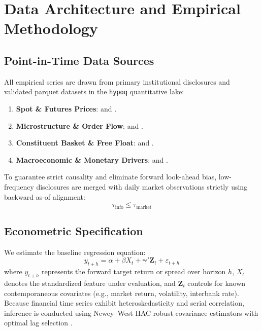\documentclass{article}
\begin{document}
\section{Data Architecture and Empirical Methodology}
\label{sec:data_methods}

\subsection{Point-in-Time Data Sources}
All empirical series are drawn from primary institutional disclosures and validated parquet datasets in the \texttt{hypoq} quantitative lake:
\begin{enumerate}
    \item \textbf{Spot \& Futures Prices}:  and .
    \item \textbf{Microstructure \& Order Flow}:  and .
    \item \textbf{Constituent Basket \& Free Float}:  and .
    \item \textbf{Macroeconomic \& Monetary Drivers}:  and .
\end{enumerate}

To guarantee strict causality and eliminate forward look-ahead bias, low-frequency disclosures are merged with daily market observations strictly using backward as-of alignment:
\begin{equation}
    \tau_{\text{info}} \le \tau_{\text{market}}
\end{equation}

\subsection{Econometric Specification}
We estimate the baseline regression equation:
\begin{equation}
    y_{t+h} = \alpha + \beta X_t + \boldsymbol{\gamma}' \mathbf{Z}_t + \varepsilon_{t+h}
    \label{eq:baseline}
\end{equation}
where $y_{t+h}$ represents the forward target return or spread over horizon $h$, $X_t$ denotes the standardized feature under evaluation, and $\mathbf{Z}_t$ controls for known contemporaneous covariates (e.g., market return, volatility, interbank rate). Because financial time series exhibit heteroskedasticity and serial correlation, inference is conducted using Newey--West HAC robust covariance estimators with optimal lag selection \citep{newey1987simple}.
\end{document}
